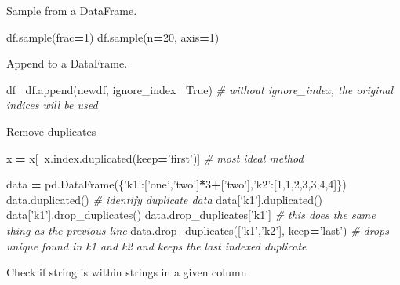 \documentclass[]{book}
\newenvironment{Shaded}{\begin{snugshade}}{\end{snugshade}}
\newcommand{\CommentTok}[1]{\textcolor[rgb]{0.56,0.35,0.01}{\textit{#1}}}
\newcommand{\DecValTok}[1]{\textcolor[rgb]{0.00,0.00,0.81}{#1}}
\newcommand{\NormalTok}[1]{#1}
\newcommand{\OperatorTok}[1]{\textcolor[rgb]{0.81,0.36,0.00}{\textbf{#1}}}
\newcommand{\StringTok}[1]{\textcolor[rgb]{0.31,0.60,0.02}{#1}}
\newcommand{\VariableTok}[1]{\textcolor[rgb]{0.00,0.00,0.00}{#1}}
\begin{document}
Sample from a DataFrame.

\begin{Shaded}
\begin{Highlighting}[]
\NormalTok{df.sample(frac}\OperatorTok{=}\DecValTok{1}\NormalTok{)}
\NormalTok{df.sample(n}\OperatorTok{=}\DecValTok{20}\NormalTok{, axis}\OperatorTok{=}\DecValTok{1}\NormalTok{)}
\end{Highlighting}
\end{Shaded}

Append to a DataFrame.

\begin{Shaded}
\begin{Highlighting}[]
\NormalTok{df}\OperatorTok{=}\NormalTok{df.append(newdf, ignore_index}\OperatorTok{=}\VariableTok{True}\NormalTok{) }\CommentTok{# without ignore_index, the original indices will be used}
\end{Highlighting}
\end{Shaded}

Remove duplicates

\begin{Shaded}
\begin{Highlighting}[]
\NormalTok{x }\OperatorTok{=}\NormalTok{ x[}\OperatorTok{~}\NormalTok{x.index.duplicated(keep}\OperatorTok{=}\StringTok{'first'}\NormalTok{)] }\CommentTok{# most ideal method}

\NormalTok{data }\OperatorTok{=}\NormalTok{ pd.DataFrame(\{}\StringTok{'k1'}\NormalTok{:[}\StringTok{'one'}\NormalTok{,}\StringTok{'two'}\NormalTok{]}\OperatorTok{*}\DecValTok{3}\OperatorTok{+}\NormalTok{[}\StringTok{'two'}\NormalTok{],}\StringTok{'k2'}\NormalTok{:[}\DecValTok{1}\NormalTok{,}\DecValTok{1}\NormalTok{,}\DecValTok{2}\NormalTok{,}\DecValTok{3}\NormalTok{,}\DecValTok{3}\NormalTok{,}\DecValTok{4}\NormalTok{,}\DecValTok{4}\NormalTok{]\})}
\NormalTok{data.duplicated() }\CommentTok{# identify duplicate data}
\NormalTok{data[‘k1’].duplicated()}
\NormalTok{data[}\StringTok{'k1'}\NormalTok{].drop_duplicates()}
\NormalTok{data.drop_duplicates[}\StringTok{'k1'}\NormalTok{] }\CommentTok{# this does the same thing as the previous line}
\NormalTok{data.drop_duplicates([}\StringTok{'k1'}\NormalTok{,}\StringTok{'k2'}\NormalTok{], keep}\OperatorTok{=}\StringTok{'last'}\NormalTok{) }\CommentTok{# drops unique found in k1 and k2 and keeps the last indexed duplicate}
\end{Highlighting}
\end{Shaded}

Check if string is within strings in a given column
\end{document}
